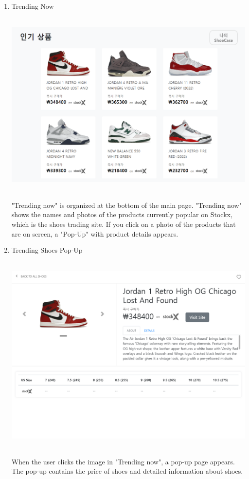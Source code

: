 \documentclass[conference]{IEEEtran}
\begin{document}
\begin{enumerate}
	\item Trending Now \\\\
\centerline{\includegraphics[scale=0.3]{pics/trending.png}}
\\ "Trending now" is organized at the bottom of the main page. "Trending now" shows the names and photos of the products currently popular on Stockx, which is the shoes trading site. If you click on a photo of the products that are on screen, a "Pop-Up" with product details appears.\\
	\item Trending Shoes Pop-Up\\\\
\centerline{\includegraphics[scale=0.35]{pics/trending_detail.png}}
\\When the user clicks the image in "Trending now", a pop-up page appears. The pop-up contains the price of shoes and detailed information about shoes.\\\\

\end{enumerate}
\end{document}
